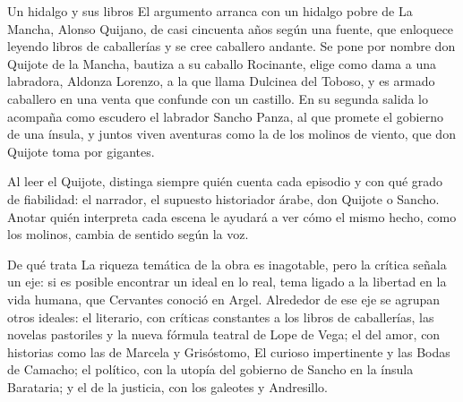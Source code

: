 \documentclass{book}
\begin{document}

\begin{tcolorbox}[title={Consejo}, studiumtip, breakable]

Un hidalgo y sus libros
El argumento arranca con un hidalgo pobre de La Mancha, Alonso Quijano, de casi cincuenta años según una fuente, que enloquece leyendo libros de caballerías y se cree caballero andante. Se pone por nombre don Quijote de la Mancha, bautiza a su caballo Rocinante, elige como dama a una labradora, Aldonza Lorenzo, a la que llama Dulcinea del Toboso, y es armado caballero en una venta que confunde con un castillo. En su segunda salida lo acompaña como escudero el labrador Sancho Panza, al que promete el gobierno de una ínsula, y juntos viven aventuras como la de los molinos de viento, que don Quijote toma por gigantes.


Al leer el Quijote, distinga siempre quién cuenta cada episodio y con qué grado de fiabilidad: el narrador, el supuesto historiador árabe, don Quijote o Sancho. Anotar quién interpreta cada escena le ayudará a ver cómo el mismo hecho, como los molinos, cambia de sentido según la voz.

\end{tcolorbox}

\begin{tcolorbox}[title={Definición}, studiumdef, breakable]

De qué trata
La riqueza temática de la obra es inagotable, pero la crítica señala un eje: si es posible encontrar un ideal en lo real, tema ligado a la libertad en la vida humana, que Cervantes conoció en Argel. Alrededor de ese eje se agrupan otros ideales: el literario, con críticas constantes a los libros de caballerías, las novelas pastoriles y la nueva fórmula teatral de Lope de Vega; el del amor, con historias como las de Marcela y Grisóstomo, El curioso impertinente y las Bodas de Camacho; el político, con la utopía del gobierno de Sancho en la ínsula Barataria; y el de la justicia, con los galeotes y Andresillo.

\end{tcolorbox}
\end{document}
